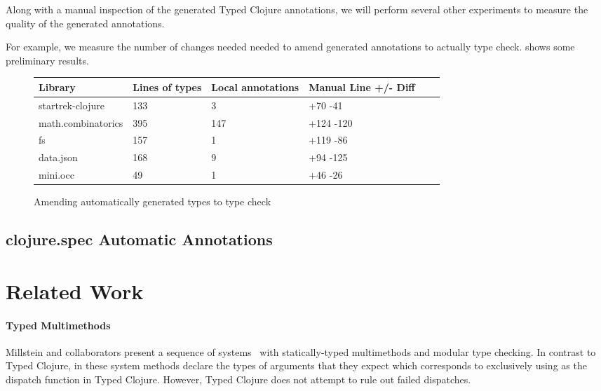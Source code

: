 \documentclass[9pt]{extarticle}
\begin{document}
Along with a manual inspection of the generated Typed Clojure annotations,
we will perform several other experiments to measure the quality of the
generated annotations.

For example, we measure the number of changes needed
needed to amend generated annotations to actually type check.
 shows some preliminary results.

\begin{figure*}
\begin{tabular}{| l | l | l | l | l | l |}
  Library            & Lines of types  & Local annotations & Manual Line +/- Diff \\
  \hline
  startrek-clojure   & 133             & 3                 & +70 -41 \\
  math.combinatorics & 395             & 147               & +124 -120\\
  fs                 & 157             & 1                 & +119 -86\\
  data.json          & 168             & 9                 & +94 -125 \\
  mini.occ           & 49              & 1                 & +46 -26\\
\end{tabular}
  \label{infer:amending}
\caption{Amending automatically generated types to type check}
\end{figure*}

\subsection{clojure.spec Automatic Annotations}

\section{Related Work}

\paragraph{Typed Multimethods} 
Millstein and collaborators present a sequence of
systems~\cite{Chambers:1992:OMC,Chambers:1994:TMM,MS02} with statically-typed multimethods
and modular type checking.  In contrast to Typed Clojure, in these
system methods declare the types of arguments that they expect which
corresponds to exclusively using  as the dispatch function
in Typed Clojure. However, Typed Clojure does not attempt to rule out
failed dispatches.
\end{document}
